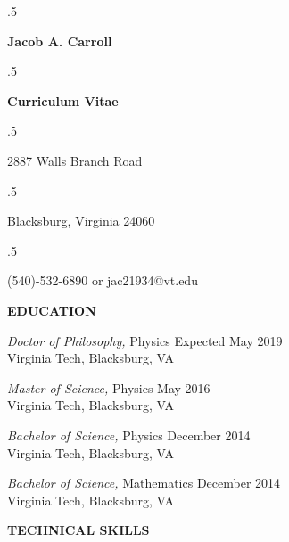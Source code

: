 \documentclass[10pt]{letter}
\begin{document}

\moveleft.5\hoffset\centerline{\Large\bf Jacob A. Carroll}
\vspace{1mm}
\moveleft.5\hoffset\centerline{\large\bf Curriculum Vitae}

\hrulefill
 
\moveleft.5\hoffset\centerline{2887 Walls Branch Road} %
\moveleft.5\hoffset\centerline{Blacksburg, Virginia 24060}
\moveleft.5\hoffset\centerline{(540)-532-6890 or jac21934@vt.edu}


{\bf EDUCATION}

{\sl Doctor of Philosophy,} Physics \hfill  Expected May 2019\\
 Virginia Tech, Blacksburg, VA \hfill %

{\sl Master of Science,} Physics \hfill  May 2016\\
 Virginia Tech, Blacksburg, VA \hfill %

{\sl Bachelor of Science,} Physics \hfill  December 2014\\
 Virginia Tech, Blacksburg, VA \hfill %

{\sl Bachelor of Science,} Mathematics \hfill  December 2014\\
 Virginia Tech, Blacksburg, VA \hfill %


 \vspace{.5cm}




{\bf TECHNICAL SKILLS} 
\end{document}
